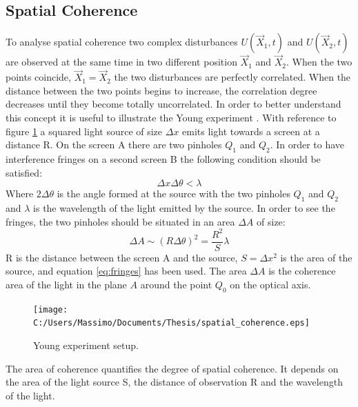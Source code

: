 \subsection{Spatial Coherence}
To analyse spatial coherence two complex disturbances $U(\overrightarrow{X}_1,t)$ and $U(\overrightarrow{X}_2,t)$ are observed at the same time in two different position $\overrightarrow{X}_1$ and $\overrightarrow{X}_2$. When the two points coincide, $\overrightarrow{X}_1=\overrightarrow{X}_2$ the two disturbances are perfectly correlated. When the distance between the two points begins to increase, the correlation degree decreases until they become totally uncorrelated. In order to better understand this concept it is useful to illustrate the Young experiment \cite{wolf2007introduction}. With reference to figure \ref{fig:spatialcoherence} a squared light source of size $\Delta x$ emits light towards a screen at a distance R. On the screen A there are two pinholes $Q_1$ and $Q_2$. In order to have interference fringes on a second screen B the following condition should be satisfied:
\begin{equation}
\label{eq:fringes}
\Delta x \Delta \theta < \lambda
\end{equation} 
Where $2\Delta\theta$ is the angle formed at the source with the two pinholes $Q_1$ and $Q_2$ and $\lambda$ is the wavelength of the light emitted by the source. In order to see the fringes, the two pinholes should be situated in an area $\Delta A$ of size:
\begin{equation}
\label{eq:area1}
\Delta A \sim (R \Delta \theta)^2 = \dfrac{R^2}{S}\lambda
\end{equation} 
R is the distance between the screen A and the source, $S=\Delta x^2$ is the area of the source, and equation \ref{eq:fringes} has been used. The area $\Delta A$ is the coherence area of the light in the plane $A$ around the point $Q_0$ on the optical axis. 
 \begin{figure}[H]
	\centering
	\texttt{[image: C:/Users/Massimo/Documents/Thesis/spatial\_coherence.eps]}
	\caption{\label{fig:spatialcoherence} Young experiment setup.}
\end{figure}
The area of coherence quantifies the degree of spatial coherence. It depends on the area of the light source S, the distance of observation R and the wavelength of the light. 
